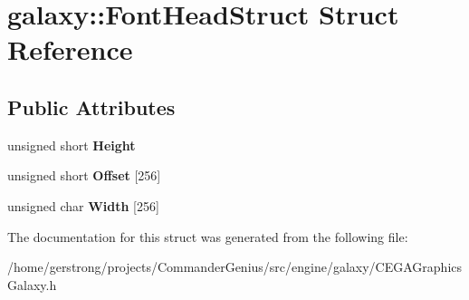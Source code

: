 \hypertarget{structgalaxy_1_1_font_head_struct}{
\section{galaxy::FontHeadStruct Struct Reference}
\label{structgalaxy_1_1_font_head_struct}
}
\subsection*{Public Attributes}
\begin{DoxyCompactItemize}
\item 
\hypertarget{structgalaxy_1_1_font_head_struct_a2e2fc534cdfd1ad4669abdda0293f752}{
unsigned short {\bfseries Height}}
\label{structgalaxy_1_1_font_head_struct_a2e2fc534cdfd1ad4669abdda0293f752}

\item 
\hypertarget{structgalaxy_1_1_font_head_struct_a26cc192f873b71a407a6439a941428d4}{
unsigned short {\bfseries Offset} \mbox{[}256\mbox{]}}
\label{structgalaxy_1_1_font_head_struct_a26cc192f873b71a407a6439a941428d4}

\item 
\hypertarget{structgalaxy_1_1_font_head_struct_acf619cc02f1e0c6450d1d23ce9bab69e}{
unsigned char {\bfseries Width} \mbox{[}256\mbox{]}}
\label{structgalaxy_1_1_font_head_struct_acf619cc02f1e0c6450d1d23ce9bab69e}

\end{DoxyCompactItemize}


The documentation for this struct was generated from the following file:\begin{DoxyCompactItemize}
\item 
/home/gerstrong/projects/CommanderGenius/src/engine/galaxy/CEGAGraphicsGalaxy.h\end{DoxyCompactItemize}
